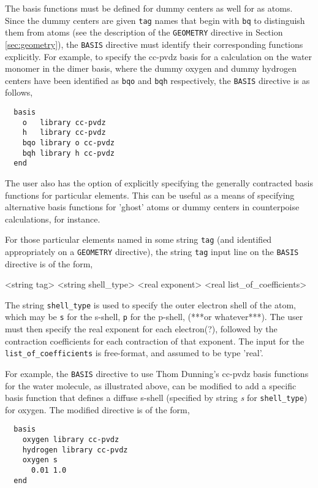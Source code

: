 The basis functions must be defined for dummy centers as well for
as atoms.  Since the dummy centers are given \verb+tag+ names that begin
with \verb+bq+ to distinguish them from atoms (see the description of the
\verb+GEOMETRY+ directive in Section \ref{sec:geometry}), the \verb+BASIS+
directive must identify their corresponding functions explicitly.  For
example, to specify the cc-pvdz basis for a calculation on the water 
monomer in the dimer basis, where the dummy oxygen and dummy hydrogen
centers have been identified as \verb+bqo+ and \verb+bqh+ respectively,
the \verb+BASIS+ directive is as follows,

\begin{verbatim}
  basis
    o   library cc-pvdz
    h   library cc-pvdz
    bqo library o cc-pvdz
    bqh library h cc-pvdz
  end
\end{verbatim}


The user also has the option of explicitly specifying the generally
contracted basis functions for particular elements.  This can be useful
as a means of specifying alternative basis functions for 'ghost' atoms
or dummy centers in counterpoise calculations, for instance.

For those particular elements named in some string \verb+tag+ (and identified
appropriately on a \verb+GEOMETRY+ directive), the string \verb+tag+ input 
line on the \verb+BASIS+ directive is of the form,

     <string tag> <string shell_type>
        <real exponent> <real list_of_coefficients>

The string \verb+shell_type+ is used to specify the outer electron shell of
the atom, which may be \verb+s+ for the s-shell, \verb+p+ for the p-shell,
(***or whatever***).  The user must then specify the real exponent for
each electron(?), followed by the contraction coefficients for each 
contraction of that exponent.  The input for the \verb+list_of_coefficients+
is free-format, and assumed to be type 'real'.

For example, the \verb+BASIS+ directive to use Thom Dunning's cc-pvdz basis 
functions for the water molecule, as illustrated above, 
can be modified to add a specific basis function that defines a diffuse 
s-shell (specified by string {\em s} for \verb+shell_type+) for oxygen.
The modified directive is of the form,

\begin{verbatim}
  basis
    oxygen library cc-pvdz
    hydrogen library cc-pvdz
    oxygen s
      0.01 1.0
  end
\end{verbatim}

